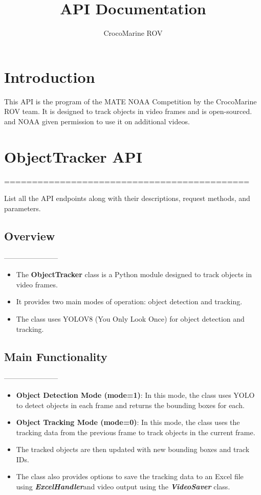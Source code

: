 \documentclass{article}
\title{API Documentation}
\author{CrocoMarine ROV}
\begin{document}
\maketitle

\tableofcontents
\hypersetup{
    colorlinks=true,
    linkcolor=blue,
    filecolor=magenta,      
    urlcolor=cyan,
}


\section{Introduction}
This API is the program of the MATE NOAA Competition by the CrocoMarine ROV team. It is designed to track objects in video frames and is open-sourced. and NOAA given permission to use it on additional videos.
\section{ObjectTracker API}
============================================

List all the API endpoints along with their descriptions, request methods, and parameters.
\subsection{Overview}
-----------------------

\begin{itemize}
    \item The \textbf{ObjectTracker} class is a Python module designed to track objects in video frames.
    \item It provides two main modes of operation: object detection and tracking.
    \item The class uses YOLOV8 (You Only Look Once) for object detection and tracking.
\end{itemize}

\subsection{Main Functionality}
-----------------------

\begin{itemize}
    \item \textbf{Object Detection Mode (mode=1)}: In this mode, the class uses YOLO to detect objects in each frame and returns the bounding boxes for each.
    \item \textbf{Object Tracking Mode  (mode=0)}: In this mode, the class uses the tracking data from the previous frame to track objects in the current frame.
    \item The tracked objects are then updated with new bounding boxes and track IDs.
    \item The class also provides options to save the tracking data to an Excel file using \textit{\textbf{ExcelHandler}}and video output using the \textit{\textbf{VideoSaver}} class.
\end{itemize}
\end{document}
